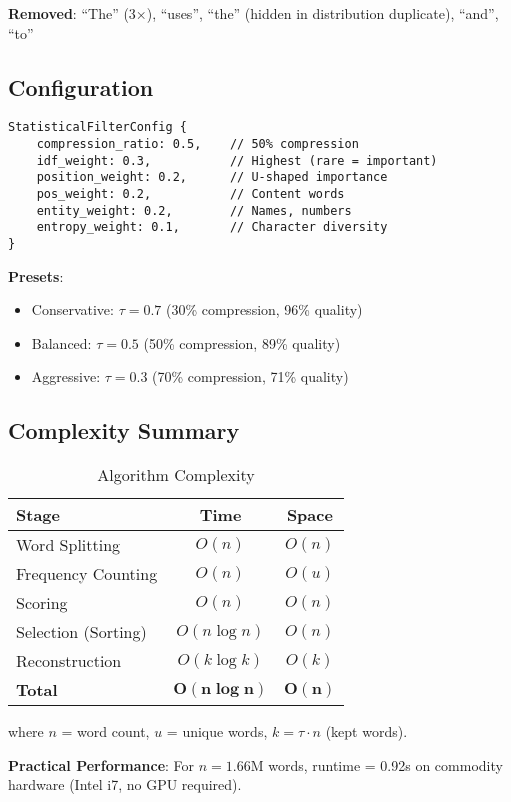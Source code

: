 \textbf{Removed}: ``The'' (3×), ``uses'', ``the'' (hidden in distribution duplicate), ``and'', ``to''

\subsection{Configuration}

\begin{verbatim}
StatisticalFilterConfig {
    compression_ratio: 0.5,    // 50% compression
    idf_weight: 0.3,           // Highest (rare = important)
    position_weight: 0.2,      // U-shaped importance
    pos_weight: 0.2,           // Content words
    entity_weight: 0.2,        // Names, numbers
    entropy_weight: 0.1,       // Character diversity
}
\end{verbatim}

\textbf{Presets}:
\begin{itemize}
    \item Conservative: $\tau = 0.7$ (30\% compression, 96\% quality)
    \item Balanced: $\tau = 0.5$ (50\% compression, 89\% quality)
    \item Aggressive: $\tau = 0.3$ (70\% compression, 71\% quality)
\end{itemize}

\subsection{Complexity Summary}

\begin{table}[h]
\centering
\caption{Algorithm Complexity}
\label{tab:complexity}
\begin{tabular}{lcc}
\toprule
Stage & Time & Space \\
\midrule
Word Splitting & $O(n)$ & $O(n)$ \\
Frequency Counting & $O(n)$ & $O(u)$ \\
Scoring & $O(n)$ & $O(n)$ \\
Selection (Sorting) & $O(n \log n)$ & $O(n)$ \\
Reconstruction & $O(k \log k)$ & $O(k)$ \\
\midrule
\textbf{Total} & $\mathbf{O(n \log n)}$ & $\mathbf{O(n)}$ \\
\bottomrule
\end{tabular}
\end{table}

where $n$ = word count, $u$ = unique words, $k = \tau \cdot n$ (kept words).

\textbf{Practical Performance}: For $n = 1.66$M words, runtime = 0.92s on commodity hardware (Intel i7, no GPU required).
